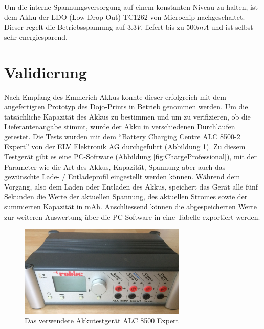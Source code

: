 
Um die interne Spannungsversorgung auf einem konstanten Niveau zu halten, ist dem Akku der LDO (Low Drop-Out) TC1262 von Microchip nachgeschaltet. Dieser regelt die Betriebsspannung auf $3.3V$, liefert bis zu $500mA$ und ist selbst sehr energiesparend.


\section{Validierung}

Nach Empfang des Emmerich-Akkus konnte dieser erfolgreich mit dem angefertigten Prototyp des Dojo-Prints in Betrieb genommen werden. Um die tatsächliche Kapazität des Akkus zu bestimmen und um zu verifizieren, ob die Lieferantenangabe stimmt, wurde der Akku in verschiedenen Durchläufen getestet. Die Tests wurden mit dem ``Battery Charging Centre ALC 8500-2 Expert'' von der ELV Elektronik AG durchgeführt (Abbildung \ref{fig:ALCExpert}). Zu diesem Testgerät gibt es eine PC-Software (Abbildung \ref{fig:ChargeProfessional}), mit der Parameter wie die Art des Akkus, Kapazität, Spannung aber auch das gewünschte Lade- / Entladeprofil eingestellt werden können. Während dem Vorgang, also dem Laden oder Entladen des Akkus, speichert das Gerät alle fünf Sekunden die Werte der aktuellen Spannung, des aktuellen Stromes sowie der summierten Kapazität in mAh. Anschliessend können die abgespeicherten Werte zur weiteren Auswertung über die PC-Software in eine Tabelle exportiert werden.\\

\begin{figure}[htp]
	\centering
	\includegraphics[width=8cm]{Bilder/ALC8500Expert.JPG}
	 \caption{Das verwendete Akkutestgerät ALC 8500 Expert}
	 \label{fig:ALCExpert}
\end{figure}

